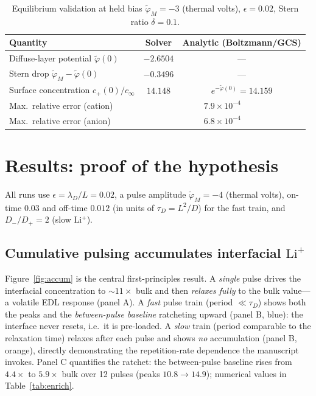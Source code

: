 \documentclass[11pt,a4paper]{article}
\newcommand{\Lip}{\ensuremath{\mathrm{Li^{+}}}}
\newcommand{\cinf}{\ensuremath{c_{\infty}}}
\begin{document}
\begin{table}[H]
\centering
\caption{Equilibrium validation at held bias $\tilde\varphi_M=-3$ (thermal
volts), $\epsilon=0.02$, Stern ratio $\delta=0.1$.}
\label{tab:val}
\begin{tabular}{lcc}
\toprule
Quantity & Solver & Analytic (Boltzmann/GCS)\\
\midrule
Diffuse-layer potential $\tilde\varphi(0)$ & $-2.6504$ & --- \\
Stern drop $\tilde\varphi_M-\tilde\varphi(0)$ & $-0.3496$ & --- \\
Surface concentration $c_+(0)/\cinf$ & $14.148$ & $e^{-\tilde\varphi(0)}=14.159$ \\
Max.\ relative error (cation) & \multicolumn{2}{c}{$7.9\times10^{-4}$} \\
Max.\ relative error (anion)  & \multicolumn{2}{c}{$6.8\times10^{-4}$} \\
\bottomrule
\end{tabular}
\end{table}

\section{Results: proof of the hypothesis}
All runs use $\epsilon=\lambda_D/L=0.02$, a pulse amplitude
$\tilde\varphi_M=-4$ (thermal volts), on-time $0.03$ and off-time $0.012$ (in
units of $\tau_D=L^2/D$) for the fast train, and $D_-/D_+=2$ (slow \Lip{}).

\subsection{Cumulative pulsing accumulates interfacial \Lip{}}
Figure~\ref{fig:accum} is the central first-principles result. A \emph{single}
pulse drives the interfacial concentration to ${\sim}11\times$ bulk and then
\emph{relaxes fully} to the bulk value---a volatile EDL response (panel A). A
\emph{fast} pulse train (period $\ll\tau_D$) shows both the peaks and the
\emph{between-pulse baseline} ratcheting upward (panel B, blue): the interface
never resets, i.e.\ it is pre-loaded. A \emph{slow} train (period comparable to
the relaxation time) relaxes after each pulse and shows \emph{no} accumulation
(panel B, orange), directly demonstrating the repetition-rate dependence the
manuscript invokes. Panel C quantifies the ratchet: the between-pulse baseline
rises from $4.4\times$ to $5.9\times$ bulk over 12 pulses (peaks $10.8\to14.9$);
numerical values in Table~\ref{tab:enrich}.
\end{document}
